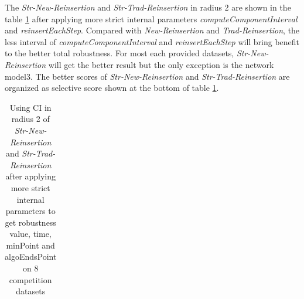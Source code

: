 \documentclass{article}
\begin{document}
	The \textit{Str-New-Reinsertion} and \textit{Str-Trad-Reinsertion} in radius 2 are shown in the table \ref{tab:table13} after applying more strict internal parameters \textit{computeComponentInterval} and \textit{reinsertEachStep}. Compared with \textit{New-Reinsertion} and \textit{Trad-Reinsertion}, the less interval of \textit{computeComponentInterval} and \textit{reinsertEachStep} will bring benefit to the better total robustness. For most each provided datasets, \textit{Str-New-Reinsertion} will get the better result but the only exception is the network model3. The better scores of \textit{Str-New-Reinsertion} and \textit{Str-Trad-Reinsertion} are organized as selective score shown at the bottom of table \ref{tab:table13}.
	 
	 
	\begin{table}[!htbp]
	\begin{adjustwidth}{-2cm}{}		
		\begin{threeparttable}		
			\centering
			\caption{Using CI in radius 2 of \textit{Str-New-Reinsertion} and \textit{Str-Trad-Reinsertion}  after applying more strict internal parameters to get robustness value, time, minPoint and algoEndsPoint on 8 competition datasets}
			\label{tab:table13}
			\begin{tabular}{|c|c|c|c|c|c|c|c|c|c|}
				\hline
					

\end{tabular}
\end{threeparttable}
\end{adjustwidth}
\end{table}
\end{document}
